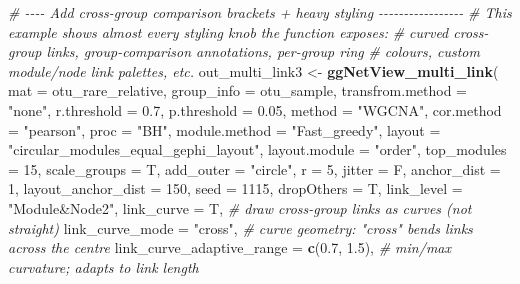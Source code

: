 \documentclass[
]{book}
\newenvironment{Shaded}{\begin{snugshade}}{\end{snugshade}}
\newcommand{\AttributeTok}[1]{\textcolor[rgb]{0.13,0.29,0.53}{#1}}
\newcommand{\CommentTok}[1]{\textcolor[rgb]{0.56,0.35,0.01}{\textit{#1}}}
\newcommand{\DecValTok}[1]{\textcolor[rgb]{0.00,0.00,0.81}{#1}}
\newcommand{\FloatTok}[1]{\textcolor[rgb]{0.00,0.00,0.81}{#1}}
\newcommand{\FunctionTok}[1]{\textcolor[rgb]{0.13,0.29,0.53}{\textbf{#1}}}
\newcommand{\NormalTok}[1]{#1}
\newcommand{\OtherTok}[1]{\textcolor[rgb]{0.56,0.35,0.01}{#1}}
\newcommand{\StringTok}[1]{\textcolor[rgb]{0.31,0.60,0.02}{#1}}
\begin{document}
\begin{Shaded}
\begin{Highlighting}[]
\CommentTok{\# {-}{-}{-}{-} Add cross{-}group comparison brackets + heavy styling {-}{-}{-}{-}{-}{-}{-}{-}{-}{-}{-}{-}{-}{-}{-}{-}{-}}
\CommentTok{\# This example shows almost every styling knob the function exposes:}
\CommentTok{\# curved cross{-}group links, group{-}comparison annotations, per{-}group ring}
\CommentTok{\# colours, custom module/node link palettes, etc.}
\NormalTok{out\_multi\_link3 }\OtherTok{\textless{}{-}} \FunctionTok{ggNetView\_multi\_link}\NormalTok{(}
  \AttributeTok{mat                          =}\NormalTok{ otu\_rare\_relative,}
  \AttributeTok{group\_info                   =}\NormalTok{ otu\_sample,}
  \AttributeTok{transfrom.method             =} \StringTok{"none"}\NormalTok{,}
  \AttributeTok{r.threshold                  =} \FloatTok{0.7}\NormalTok{,}
  \AttributeTok{p.threshold                  =} \FloatTok{0.05}\NormalTok{,}
  \AttributeTok{method                       =} \StringTok{"WGCNA"}\NormalTok{,}
  \AttributeTok{cor.method                   =} \StringTok{"pearson"}\NormalTok{,}
  \AttributeTok{proc                         =} \StringTok{"BH"}\NormalTok{,}
  \AttributeTok{module.method                =} \StringTok{"Fast\_greedy"}\NormalTok{,}
  \AttributeTok{layout                       =} \StringTok{"circular\_modules\_equal\_gephi\_layout"}\NormalTok{,}
  \AttributeTok{layout.module                =} \StringTok{"order"}\NormalTok{,}
  \AttributeTok{top\_modules                  =} \DecValTok{15}\NormalTok{,}
  \AttributeTok{scale\_groups                 =}\NormalTok{ T,}
  \AttributeTok{add\_outer                    =} \StringTok{"circle"}\NormalTok{,}
  \AttributeTok{r                            =} \DecValTok{5}\NormalTok{,}
  \AttributeTok{jitter                       =}\NormalTok{ F,}
  \AttributeTok{anchor\_dist                  =} \DecValTok{1}\NormalTok{,}
  \AttributeTok{layout\_anchor\_dist           =} \DecValTok{150}\NormalTok{,}
  \AttributeTok{seed                         =} \DecValTok{1115}\NormalTok{,}
  \AttributeTok{dropOthers                   =}\NormalTok{ T,}
  \AttributeTok{link\_level                   =} \StringTok{"Module\&Node2"}\NormalTok{,}
  \AttributeTok{link\_curve                   =}\NormalTok{ T,             }\CommentTok{\# draw cross{-}group links as curves (not straight)}
  \AttributeTok{link\_curve\_mode              =} \StringTok{"cross"}\NormalTok{,       }\CommentTok{\# curve geometry: "cross" bends links across the centre}
  \AttributeTok{link\_curve\_adaptive\_range    =} \FunctionTok{c}\NormalTok{(}\FloatTok{0.7}\NormalTok{, }\FloatTok{1.5}\NormalTok{),   }\CommentTok{\# min/max curvature; adapts to link length}

\end{Highlighting}
\end{Shaded}
\end{document}
